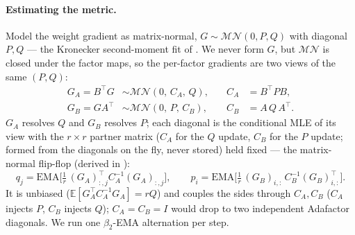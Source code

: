 \documentclass[11pt]{article}
\newcommand{\E}{\mathbb{E}}
\theoremstyle{plain}
\theoremstyle{definition}
\theoremstyle{remark}
\begin{document}
\paragraph{Estimating the metric.}
\label{par:coupling}
Model the weight gradient as matrix-normal, $G\sim\mathcal{MN}(0,P,Q)$ with diagonal $P,Q$ --- the Kronecker second-moment fit of \cite{klshampoo,soap}. We never form $G$, but $\mathcal{MN}$ is closed under the factor maps, so the per-factor gradients are two views of the same $(P,Q)$:
\begin{equation}
\begin{aligned}
  G_A=B^\top G &\sim\mathcal{MN}(0,\,C_A,\,Q), &\quad C_A&=B^\top P B,\\
  G_B=GA^\top  &\sim\mathcal{MN}(0,\,P,\,C_B), &\quad C_B&=A\,Q\,A^\top .
\end{aligned}
\label{eq:ours-closure}
\end{equation}
$G_A$ resolves $Q$ and $G_B$ resolves $P$; each diagonal is the conditional MLE of its view with the $r\times r$ partner matrix ($C_A$ for the $Q$ update, $C_B$ for the $P$ update; formed from the diagonals on the fly, never stored) held fixed --- the matrix-normal flip-flop \cite{klshampoo,dutilleul} (derived in ):
\begin{equation}
  q_j=\mathrm{EMA}\Big[\tfrac1r\,(G_A)_{:,j}^\top C_A^{-1}(G_A)_{:,j}\Big],\qquad
  p_i=\mathrm{EMA}\Big[\tfrac1r\,(G_B)_{i,:}\,C_B^{-1}(G_B)_{i,:}^\top\Big].
  \label{eq:ours-klcoupling}
\end{equation}
It is unbiased ($\E[G_A^\top C_A^{-1}G_A]=rQ$) and couples the sides through $C_A,C_B$ ($C_A$ injects $P$, $C_B$ injects $Q$); $C_A=C_B=I$ would drop to two independent Adafactor diagonals. We run one $\beta_2$-EMA alternation per step.
\end{document}
